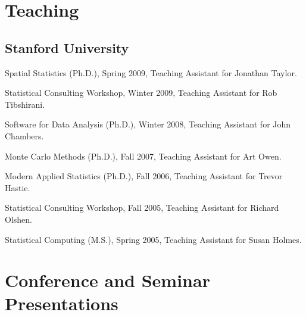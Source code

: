 \documentclass[10pt,letterpaper]{article}
\renewenvironment{itemize}{
  \begin{list}{}{
    \setlength{\leftmargin}{1.5em}
    \setlength{\itemsep}{0.25em}
    \setlength{\parskip}{0pt}
    \setlength{\parsep}{0.25em}
  }
}{
  \end{list}
}
\begin{document}
\section*{Teaching}


\subsection*{Stanford University}

\begin{itemize}
\item Spatial Statistics (Ph.D.), Spring 2009, Teaching Assistant for Jonathan Taylor.
\item Statistical Consulting Workshop, Winter 2009, Teaching Assistant for Rob Tibshirani.
\item Software for Data Analysis (Ph.D.), Winter 2008, Teaching Assistant for John Chambers.
\item Monte Carlo Methods (Ph.D.), Fall 2007, Teaching Assistant for Art Owen.
\item Modern Applied Statistics (Ph.D.), Fall 2006, Teaching Assistant for Trevor Hastie.
\item Statistical Consulting Workshop, Fall 2005, Teaching Assistant for Richard Olshen.
\item Statistical Computing (M.S.), Spring 2005, Teaching Assistant for Susan Holmes.
\end{itemize}


\section*{Conference and Seminar Presentations}
\end{document}
